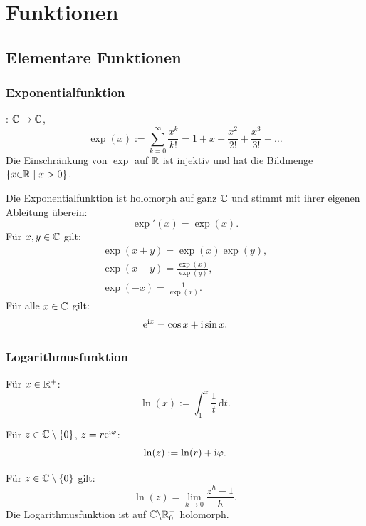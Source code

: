 
\chapter{Funktionen}
\section{Elementare Funktionen}
\subsection{Exponentialfunktion}
 : $\mathbb C\to\mathbb C$,
\begin{equation}
\exp(x) := \sum_{k=0}^{\infty} \frac{x^k}{k!}
= 1+x+\frac{x^2}{2!}+\frac{x^3}{3!}+\ldots
\end{equation}
Die Einschränkung von $\exp$ auf $\mathbb R$ ist injektiv und
hat die Bildmenge $\{x{\in}\mathbb R\mid x>0\}$.

Die Exponentialfunktion ist holomorph auf ganz $\mathbb C$ und stimmt
mit ihrer eigenen Ableitung überein:
\begin{equation}
\exp'(x) = \exp(x).
\end{equation}
Für $x,y\in\mathbb C$ gilt:
\begin{gather}
\exp(x+y) = \exp(x)\exp(y),\\
\exp(x-y) = \frac{\exp(x)}{\exp(y)},\\
\exp(-x) = \frac{1}{\exp(x)}.
\end{gather}
 Für alle $x\in\mathbb C$ gilt:
\begin{equation}
\mathrm e^{\mathrm i x} = \cos x+\mathrm i\sin x.
\end{equation}

\subsection{Logarithmusfunktion}
\begin{definition}
Für $x\in\mathbb R^+$:
\begin{equation}
\ln(x):=\int_1^x \frac{1}{t}\,\mathrm dt.
\end{equation}

Für $z\in\mathbb C\setminus\{0\}$, $z=r\mathrm e^{\mathrm i\varphi}$:
\begin{equation}
\ln(z):=\ln(r)+\mathrm i\varphi.
\end{equation}
\end{definition}
\noindent
{}
Für $z\in\mathbb C\setminus\{0\}$ gilt:
\begin{equation}
\ln(z)=\lim_{h\to 0}\frac{z^h-1}{h}.
\end{equation}
Die Logarithmusfunktion ist auf $\mathbb C{\setminus}\mathbb R_0^-$ holomorph.

